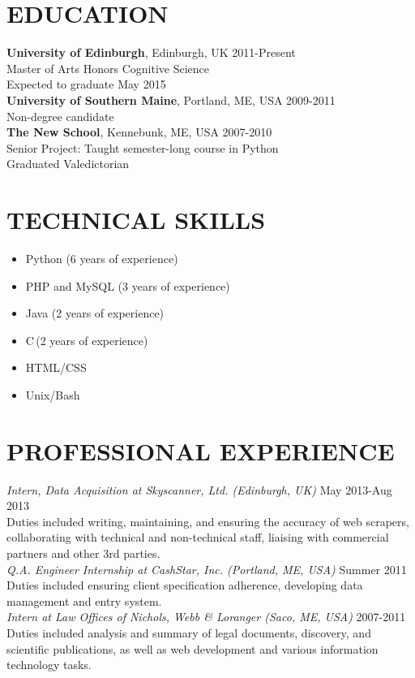 \documentclass[line, margin]{res}
\newcommand{\CS}{C\nolinebreak\hspace{-.05em}\raisebox{.6ex}{\scriptsize\bf \#}}
\begin{document}
\address{24 Lutton Place\\ Edinburgh, Scotland EH8 9PE | 001 44 7719 663016 | chase@chasestevens.com}

\begin{resume}
\section{EDUCATION}
\textbf{University of Edinburgh}, Edinburgh, UK \hfill 2011-Present\\
Master of Arts Honors Cognitive Science \\
Expected to graduate May 2015 \\[5pt]
\textbf{University of Southern Maine}, Portland, ME, USA \hfill 2009-2011\\
Non-degree candidate\\[5pt]
\textbf{The New School}, Kennebunk, ME, USA \hfill 2007-2010\\
Senior Project: Taught semester-long course in Python \\
Graduated Valedictorian

\section{TECHNICAL SKILLS}
\begin{itemize}[leftmargin=10pt]
\item Python (6 years of experience)
\item PHP and MySQL (3 years of experience)
\item Java (2 years of experience)
\item \CS \,(2 years of experience)
\item HTML/CSS
\item Unix/Bash
\end{itemize}

\section{PROFESSIONAL EXPERIENCE}
\textit{Intern, Data Acquisition at Skyscanner, Ltd. (Edinburgh, UK)} \hfill May 2013-Aug 2013 \\
Duties included writing, maintaining, and ensuring the accuracy of web scrapers, collaborating with technical and non-technical staff, liaising with commercial partners and other 3rd parties.\\[5pt]
\textit{Q.A. Engineer Internship at CashStar, Inc. (Portland, ME, USA)} \hfill Summer 2011 \\
Duties included ensuring client specification adherence, developing data management and entry system.\\[5pt]
\textit{Intern at Law Offices of Nichols, Webb \& Loranger (Saco, ME, USA)} \hfill 2007-2011 \\
Duties included analysis and summary of legal documents, discovery, and scientific publications, as well as web development and various information technology tasks. 


\end{resume}
\end{document}
